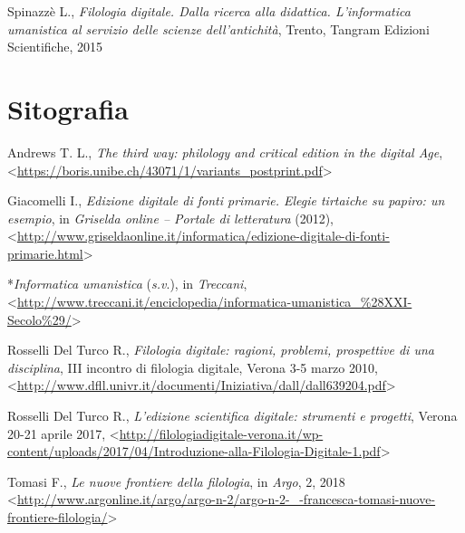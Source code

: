 \documentclass[
  b5paper,
  twoside,
  11pt,
  chapterprefix=false,
  bibliography=totocnumbered,
  parskip=0]{scrbook}
\begin{document}
Spinazzè L., \emph{Filologia digitale. Dalla ricerca alla didattica.
L'informatica umanistica al servizio delle scienze dell'antichità},
Trento, Tangram Edizioni Scientifiche, 2015

\hypertarget{sitografia-12}{%
\section*{Sitografia}\label{sitografia-12}}

Andrews T. L., \emph{The third way: philology and critical edition in the
digital Age},
\textless{}\href{https://boris.unibe.ch/43071/1/variants_postprint.pdf}{{https://boris.unibe.ch/43071/1/variants\_postprint.pdf}}\textgreater~

Giacomelli I., \emph{Edizione digitale di fonti primarie. Elegie tirtaiche su
papiro: un esempio}, in \emph{Griselda online -- Portale di letteratura}
(2012),
\textless{}\href{http://www.griseldaonline.it/informatica/edizione-digitale-di-fonti-primarie.html}{{http://www.griseldaonline.it/informatica/edizione-digitale-di-fonti-primarie.html}}\textgreater{}

*\emph{Informatica umanistica} (\emph{s.v}.), in \emph{Treccani},
\textless{}{\href{http://www.treccani.it/enciclopedia/informatica-umanistica_(XXI-Secolo)/}{http://www.treccani.it/enciclopedia/informatica-umanistica\_\%28XXI-Secolo\%29/}\textgreater{}}

Rosselli Del Turco R., \emph{Filologia digitale: ragioni, problemi,
prospettive di una disciplina}, III incontro di filologia digitale,
Verona 3-5 marzo 2010,
\textless{}\href{http://www.dfll.univr.it/documenti/Iniziativa/dall/dall639204.pdf}{{http://www.dfll.univr.it/documenti/Iniziativa/dall/dall639204.pdf}}\textgreater{}

Rosselli Del Turco R., \emph{L'edizione scientifica digitale: strumenti e
progetti}, Verona 20-21 aprile 2017,
\textless{}\href{http://filologiadigitale-verona.it/wp-content/uploads/2017/04/Introduzione-alla-Filologia-Digitale-1.pdf}{{http://filologiadigitale-verona.it/wp-content/uploads/2017/04/Introduzione-alla-Filologia-Digitale-1.pdf}}\textgreater{}

Tomasi F., \emph{Le nuove frontiere della filologia}, in \emph{Argo}, 2, 2018
\textless{}\href{http://www.argonline.it/argo/argo-n-2/argo-n-2-_-francesca-tomasi-nuove-frontiere-filologia/}{{http://www.argonline.it/argo/argo-n-2/argo-n-2-\_-francesca-tomasi-nuove-frontiere-filologia/}}\textgreater{}
\end{document}
